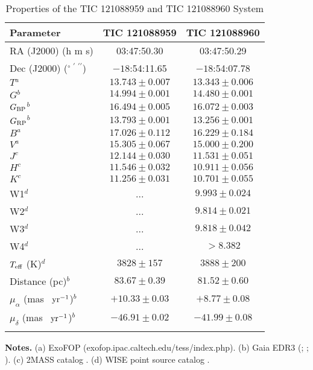 \documentclass[fleqn,usenatbib]{mnras} %
\begin{document}
\begin{table}
\centering
\caption{Properties of the TIC 121088959 and TIC 121088960 System}
\begin{tabular}{lcc}
\hline
\hline
Parameter & TIC 121088959 & TIC 121088960 \\
\hline
RA (J2000) (h m s)& 03:47:50.30 &  03:47:50.29 \\
Dec (J2000) ($^\circ \ ^\prime \ ^{\prime\prime}$) &  $-18$:54:11.65 & $-18$:54:07.78 \\
$T$$^a$ & $13.743 \pm 0.007$ & $13.343 \pm 0.006$ \\
$G$$^b$ & $14.994 \pm 0.001$ & $14.480 \pm 0.001$ \\
$G_{\rm BP}$$^b$ & $16.494 \pm 0.005$  & $16.072 \pm 0.003$ \\
$G_{\rm RP}$$^b$ & $13.793 \pm 0.001$ & $13.256 \pm 0.001$\\
$B^a$ & $17.026 \pm 0.112$ & $16.229 \pm 0.184$\\
$V^a$ & $15.305 \pm 0.067$ & $15.000 \pm 0.200$ \\
$J^c$ & $12.144 \pm 0.030$   & $11.531 \pm 0.051$ \\
$H^c$ & $11.546 \pm 0.032$  & $10.911 \pm 0.056$ \\
$K^c$ & $11.256 \pm 0.031$ & $10.701 \pm 0.055$ \\
W1$^d$ & ... & $9.993 \pm 0.024$ \\
W2$^d$ & ... & $9.814 \pm 0.021$ \\
W3$^d$ & ...  & $9.818 \pm 0.042$ \\
W4$^d$ & ... & $> 8.382$  \\
$T_{\rm eff}$ (K)$^d$ & $3828 \pm 157$ & $3888 \pm 200$ \\
Distance (pc)$^b$ & $ 83.67 \pm 0.39$ & $ 81.52 \pm 0.60$\\
$\mu_\alpha$ (mas ~${\rm yr}^{-1}$)$^b$ & $+10.33 \pm 0.03$ & $+8.77 \pm 0.08$ \\
$\mu_\delta$ (mas ~${\rm yr}^{-1}$)$^b$ &  $-46.91 \pm 0.02$ & $-41.99 \pm 0.08$ \\
\hline
\label{tab:mags}  %
\end{tabular}

{\bf Notes.}  (a) ExoFOP (exofop.ipac.caltech.edu/tess/index.php).  (b) Gaia EDR3 (\citealt{Lindegren2021a};
\citealt{Lindegren2021b}; \citealt{GaiaEDR3}).  (c) 2MASS catalog \citep{Skrutskie2006}.  (d) WISE point source catalog \citep{Cutri2013}.
\end{table}
\end{document}
